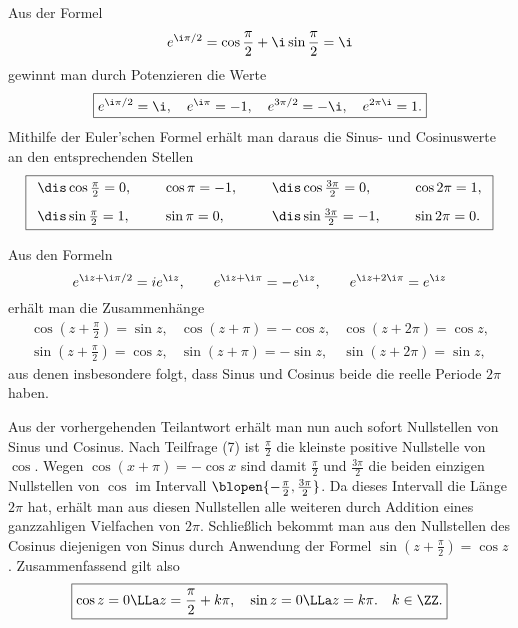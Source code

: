 \begin{antwort}
  \medskip
  \noindent
   Aus der Formel 
  \[
  e^{\i\pi/2} = \cos \frac{\pi}{2}+\i\sin\frac{\pi}{2} = \i 
  \]
  gewinnt man durch Potenzieren die Werte 
  \[
  \boxed{
    e^{\i\pi/2}=\i,\quad e^{\i\pi}=-1, \quad e^{3\pi/2} = -\i,\quad e^{2\pi \i}=1.
  }
  \]
  Mithilfe der Euler'schen Formel erhält man daraus die 
  Sinus- und Cosinuswerte an den entsprechenden Stellen 
  \[
  \boxed{
    \begin{array}{lp{2mm}lp{2mm}lp{2mm}l}
      \dis \cos \frac{\pi}{2}=0, & &  
      \cos \pi=-1,  & &  
      \dis \cos \frac{3\pi}{2}=0, & & 
      \cos 2\pi = 1, \\[3mm]
      \dis \sin \frac{\pi}{2}=1, & &  
      \sin \pi=0,  &  &
      \dis \sin \frac{3\pi}{2}=-1, & & 
      \sin 2\pi =0.
    \end{array}
  }
  \]

  \medskip
  \noindent
   Aus den Formeln
  \[
  e^{\i z+\i\pi/2} = ie^{\i z}, \qquad 
  e^{\i z+\i\pi} = -e^{\i z}, \qquad
  e^{\i z+2\i \pi} = e^{\i z}
  \]
  erhält man die Zusammenhänge
  \[
  \boxed{
    \begin{array}{ccc}
      \cos \left( z+\frac{\pi}{2} \right) = \sin z, & 
      \cos \left( z+\pi \right) = -\cos z, & 
      \cos \left( z+ 2\pi \right) = \cos z, \\
      \sin \left( z+\frac{\pi}{2} \right) = \cos z, & 
      \sin \left( z+\pi \right) = -\sin z, & 
      \sin \left( z+ 2\pi \right) = \sin z,
    \end{array}
  }
  \]
  aus denen insbesondere folgt, dass Sinus und Cosinus beide die reelle 
  Periode $2\pi$ haben. 
  
  \medskip\noindent
   Aus der vorhergehenden Teilantwort erhält man nun auch sofort 
   Nullstellen von Sinus und Cosinus. 
  Nach Teilfrage (7) 
  ist $\frac{\pi}{2}$ die kleinste positive Nullstelle von $\cos$.
  Wegen $\cos(x+\pi)=-\cos x$ sind damit 
  $\frac{\pi}{2}$ und $\frac{3\pi}{2}$ die beiden 
  einzigen Nullstellen von $\cos$ im Intervall 
  $\blopen{ -\frac{\pi}{2}, \frac{3\pi}{2}}$. Da dieses Intervall die 
  Länge $2\pi$ hat, erhält man aus diesen Nullstellen alle weiteren 
  durch Addition eines ganzzahligen Vielfachen von $2\pi$. 
  Schließlich bekommt man aus den Nullstellen des Cosinus diejenigen 
  von Sinus durch Anwendung der Formel 
  $\sin( z+\frac{\pi}{2} )=\cos z$. 
  Zusammenfassend gilt also
  \[
  \boxed{
    \cos z=0 \LLa z = \frac{\pi}{2} + k\pi, \quad
    \sin z=0 \LLa z = k\pi. \quad{ k\in\ZZ }.  
  }
  \]


\end{antwort}
